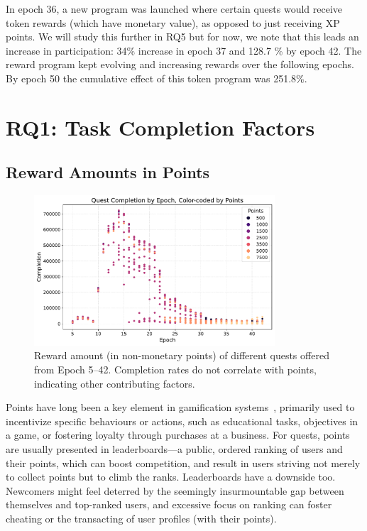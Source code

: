 In epoch 36, a new program was launched where certain quests would receive token rewards (which have monetary value), as opposed to just receiving XP points. We will study this further in RQ5 but for now, we note that this leads an increase in participation: 34\% increase in epoch 37 and 128.7 \% by epoch 42. The reward program kept evolving and increasing rewards over the following epochs. By epoch 50 the cumulative effect of this token program was 251.8\%.



\section{RQ1: Task Completion Factors}
\subsection{Reward Amounts in Points}

\begin{figure}[t]
    \centering
    \includegraphics[width=0.8\textwidth]{figures/points.pdf}
    \caption{Reward amount (in non-monetary points) of different quests offered from Epoch 5--42. Completion rates do not correlate with points, indicating other contributing factors.\label{fig:points}}
\end{figure}

Points have long been a key element in gamification systems~\cite{HKS14}, primarily used to incentivize specific behaviours or actions, such as educational tasks, objectives in a game, or fostering loyalty through purchases at a business. For quests, points are usually presented in leaderboards---a public, ordered ranking of users and their points, which can boost competition, and result in users striving not merely to collect points but to climb the ranks. Leaderboards have a downside too. Newcomers might feel deterred by the seemingly insurmountable gap between themselves and top-ranked users, and excessive focus on ranking can foster cheating or the transacting of user profiles (with their points).


